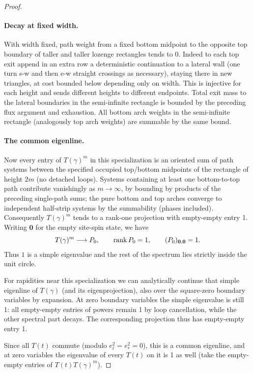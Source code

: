 \begin{proof}
\paragraph{Decay at fixed width.}
With width fixed, path weight from a fixed bottom midpoint to the opposite top boundary of taller and taller lozenge rectangles tends to 0. Indeed to each top exit append in an extra row a deterministic continuation to a lateral wall (one turn s-w and then e-w straight crossings as necessary), staying there in new triangles, at cost bounded below depending only on width. This is injective for each height and sends different heights to different endpoints. Total exit mass to the lateral boundaries in the semi-infinite rectangle is bounded by the preceding flux argument and exhaustion. All bottom arch weights in the semi-infinite rectangle (analogously top arch weights) are summable by the same bound.

\paragraph{The common eigenline.}
Now every entry of $T(\gamma)^m$ in this specialization is an oriented sum of path systems between the specified occupied top/bottom midpoints of the rectangle of height $2m$ (no detached loops). Systems containing at least one bottom-to-top path contribute vanishingly as $m\to\infty$, by bounding by products of the preceding single-path sums; the pure bottom and top arches converge to independent half-strip systems by the summability (phases included). Consequently $T(\gamma)^m$ tends to a rank-one projection with empty-empty entry 1. Writing $\mathbf0$ for the empty site-spin state, we have
\[
 T(\gamma)^m\longrightarrow P_0,\qquad \operatorname{rank} P_0=1,\qquad (P_0)_{\mathbf0,\mathbf0}=1.
\]
Thus $1$ is a simple eigenvalue and the rest of the spectrum lies strictly inside the unit circle.

For rapidities near this specialization we can analytically continue that simple eigenline of $T(\gamma)$ (and its eigenprojection), also over the square-zero boundary variables by expansion. At zero boundary variables the simple eigenvalue is still 1: all empty-empty entries of powers remain 1 by loop cancellation, while the other spectral part decays. The corresponding projection thus has empty-empty entry 1. 

Since all $T(t)$ commute (modulo $e_\ell^2=e_r^2=0$), this is a common eigenline, and at zero variables the eigenvalue of every $T(t)$ on it is 1 as well (take the empty-empty entries of $T(t)T(\gamma)^m$). 


\end{proof}
